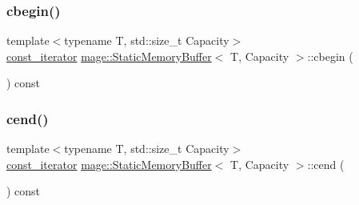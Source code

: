 \mbox{\label{classmage_1_1_static_memory_buffer_a49146a3f7659bba4ca21ff6aae135c5b}} 
\subsubsection{\texorpdfstring{cbegin()}{cbegin()}}
{\footnotesize\ttfamily template$<$typename T, std\+::size\+\_\+t Capacity$>$ \\
\mbox{\hyperlink{classmage_1_1_static_memory_buffer_aa871d2967d2e9f4219ab47c16563e328}{const\+\_\+iterator}} \mbox{\hyperlink{classmage_1_1_static_memory_buffer}{mage\+::\+Static\+Memory\+Buffer}}$<$ T, Capacity $>$\+::cbegin (\begin{DoxyParamCaption}{ }\end{DoxyParamCaption}) const\hspace{0.3cm}{\ttfamily [noexcept]}}

\mbox{\label{classmage_1_1_static_memory_buffer_ad987231ef0b906929972ace53068c29a}} 
\subsubsection{\texorpdfstring{cend()}{cend()}}
{\footnotesize\ttfamily template$<$typename T, std\+::size\+\_\+t Capacity$>$ \\
\mbox{\hyperlink{classmage_1_1_static_memory_buffer_aa871d2967d2e9f4219ab47c16563e328}{const\+\_\+iterator}} \mbox{\hyperlink{classmage_1_1_static_memory_buffer}{mage\+::\+Static\+Memory\+Buffer}}$<$ T, Capacity $>$\+::cend (\begin{DoxyParamCaption}{ }\end{DoxyParamCaption}) const\hspace{0.3cm}{\ttfamily [noexcept]}}

\mbox{\label{classmage_1_1_static_memory_buffer_aea177c968105e55bc31e39ee74d93855}} 
